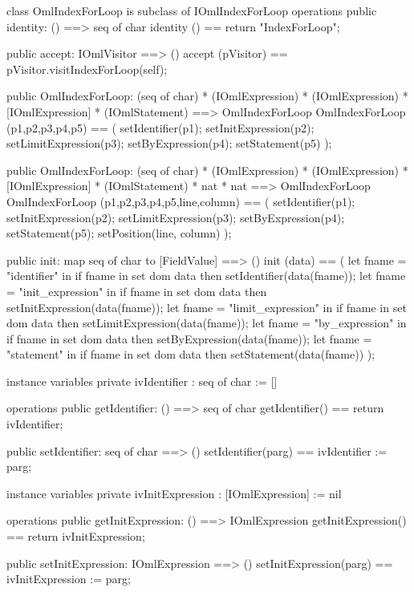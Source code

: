 \begin{vdm_al}
class OmlIndexForLoop is subclass of IOmlIndexForLoop
operations
  public identity: () ==> seq of char
  identity () == return "IndexForLoop";

  public accept: IOmlVisitor ==> ()
  accept (pVisitor) == pVisitor.visitIndexForLoop(self);

  public OmlIndexForLoop:
    (seq of char) *
    (IOmlExpression) *
    (IOmlExpression) *
    [IOmlExpression] *
    (IOmlStatement) ==> OmlIndexForLoop
  OmlIndexForLoop (p1,p2,p3,p4,p5) == 
    ( setIdentifier(p1);
      setInitExpression(p2);
      setLimitExpression(p3);
      setByExpression(p4);
      setStatement(p5) );

  public OmlIndexForLoop:
    (seq of char) *
    (IOmlExpression) *
    (IOmlExpression) *
    [IOmlExpression] *
    (IOmlStatement) *
    nat *
    nat ==> OmlIndexForLoop
  OmlIndexForLoop (p1,p2,p3,p4,p5,line,column) == 
    ( setIdentifier(p1);
      setInitExpression(p2);
      setLimitExpression(p3);
      setByExpression(p4);
      setStatement(p5);
      setPosition(line, column) );

  public init: map seq of char to [FieldValue] ==> ()
  init (data) ==
    ( let fname = "identifier" in
        if fname in set dom data
        then setIdentifier(data(fname));
      let fname = "init_expression" in
        if fname in set dom data
        then setInitExpression(data(fname));
      let fname = "limit_expression" in
        if fname in set dom data
        then setLimitExpression(data(fname));
      let fname = "by_expression" in
        if fname in set dom data
        then setByExpression(data(fname));
      let fname = "statement" in
        if fname in set dom data
        then setStatement(data(fname)) );

instance variables
  private ivIdentifier : seq of char := []

operations
  public getIdentifier: () ==> seq of char
  getIdentifier() == return ivIdentifier;

  public setIdentifier: seq of char ==> ()
  setIdentifier(parg) == ivIdentifier := parg;

instance variables
  private ivInitExpression : [IOmlExpression] := nil

operations
  public getInitExpression: () ==> IOmlExpression
  getInitExpression() == return ivInitExpression;

  public setInitExpression: IOmlExpression ==> ()
  setInitExpression(parg) == ivInitExpression := parg;


\end{vdm_al}
